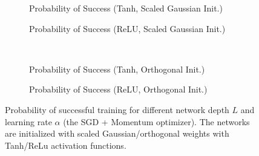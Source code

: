 \begin{figure}[h]
\centering
\newcommand{\myWidth}{0.28\textwidth}
\newcommand{\myspace}{\hspace{3mm}}
\begin{subfigure}{\myWidth}
  \centering
  \caption{Probability of Success (Tanh, Scaled Gaussian Init.)}
  \label{fig:mnist_momentum_s1}
\end{subfigure}\myspace%
\begin{subfigure}{\myWidth}
  \centering
  \caption{Probability of Success (ReLU, Scaled Gaussian Init.)}
  \label{fig:mnist_momentum_s2}
\end{subfigure}\myspace
\begin{subfigure}{8mm}
\end{subfigure}%
\\
\begin{subfigure}{\myWidth}
  \centering
  \caption{Probability of Success (Tanh, Orthogonal Init.)}
  \label{fig:mnist_momentum_s3}
\end{subfigure}\myspace
\begin{subfigure}{\myWidth}
  \centering
  \caption{Probability of Success (ReLU, Orthogonal Init.)}
  \label{fig:mnist_momentum_s4}
\end{subfigure}\myspace
\begin{subfigure}{8mm}
\end{subfigure}%
\caption{Probability of successful training for different network depth $L$ and learning rate $\alpha$ (the SGD + Momentum optimizer).  The networks are initialized with scaled Gaussian/orthogonal weights with Tanh/ReLu activation functions.
}
\label{fig:mnist_momentum}
\end{figure}
